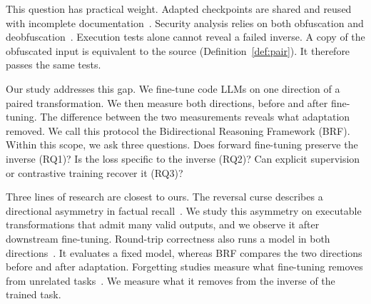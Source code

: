 This question has practical weight.
Adapted checkpoints are shared and reused with incomplete documentation~\cite{jiang2023reuse}.
Security analysis relies on both obfuscation and deobfuscation~\cite{wermke2018obfuscation,bichsel2016deguard}.
Execution tests alone cannot reveal a failed inverse.
A copy of the obfuscated input is equivalent to the source (Definition~\ref{def:pair}).
It therefore passes the same tests.
 

 Our study addresses this gap.
We fine-tune code LLMs on one direction of a paired transformation.
We then measure both directions, before and after fine-tuning.
The difference between the two measurements reveals what adaptation removed.
We call this protocol the Bidirectional Reasoning Framework (BRF).
Within this scope, we ask three questions.
Does forward fine-tuning preserve the inverse (RQ1)?
Is the loss specific to the inverse (RQ2)?
Can explicit supervision or contrastive training recover it (RQ3)?

Three lines of research are closest to ours.
The reversal curse describes a directional asymmetry in factual recall~\cite{berglund2024reversal}.
We study this asymmetry on executable transformations that admit many valid outputs, and we observe it after downstream fine-tuning.
Round-trip correctness also runs a model in both directions~\cite{allamanis2024roundtrip}.
It evaluates a fixed model, whereas BRF compares the two directions before and after adaptation.
Forgetting studies measure what fine-tuning removes from unrelated tasks~\cite{kotha2024implicit, weyssow2023continual}.
We measure what it removes from the inverse of the trained task.
